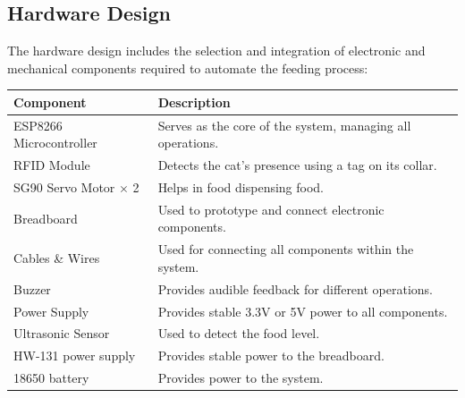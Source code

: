 \documentclass[10pt,a4paper]{extarticle}
\begin{document}
\subsection{Hardware Design}
The hardware design includes the selection and integration of electronic and mechanical components required to automate the feeding process:

\vspace{-0.5\baselineskip}
\begin{table}[H]
   \renewcommand{\arraystretch}{1.5}
   \begin{longtable}{@{}p{5cm}p{10cm}@{}}\toprule
      \textbf{Component} & \textbf{Description} \\\midrule
      ESP8266 Microcontroller & Serves as the core of the system, managing all operations. \\
      
      RFID Module & Detects the cat's presence using a tag on its collar. \\
      
      SG90 Servo Motor $\times$ 2 & Helps in food dispensing food. \\
      
      Breadboard & Used to prototype and connect electronic components. \\
      
      Cables \& Wires & Used for connecting all components within the system.\\
      
      Buzzer & Provides audible feedback for different operations. \\
      
      Power Supply & Provides stable 3.3V or 5V power to all components. \\
      
      Ultrasonic Sensor & Used to detect the food level. \\
      
      HW-131 power supply & Provides stable power to the breadboard. \\

      18650 battery & Provides power to the system.
      \\\bottomrule
   \end{longtable}
\end{table}
\end{document}
